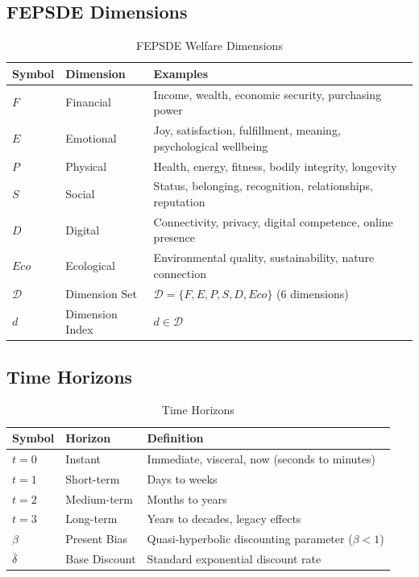 \subsection{FEPSDE Dimensions}

\begin{longtable}{@{}lp{3cm}p{8cm}@{}}
\caption{FEPSDE Welfare Dimensions} \\
\toprule
\textbf{Symbol} & \textbf{Dimension} & \textbf{Examples} \\
\midrule
\endfirsthead
\midrule
\endhead
\bottomrule
\endlastfoot

$F$ & Financial & Income, wealth, economic security, purchasing power \\
$E$ & Emotional & Joy, satisfaction, fulfillment, meaning, psychological wellbeing \\
$P$ & Physical & Health, energy, fitness, bodily integrity, longevity \\
$S$ & Social & Status, belonging, recognition, relationships, reputation \\
$D$ & Digital & Connectivity, privacy, digital competence, online presence \\
$Eco$ & Ecological & Environmental quality, sustainability, nature connection \\
\addlinespace
$\mathcal{D}$ & Dimension Set & $\mathcal{D} = \{F, E, P, S, D, Eco\}$ (6 dimensions) \\
$d$ & Dimension Index & $d \in \mathcal{D}$ \\

\end{longtable}

\subsection{Time Horizons}

\begin{longtable}{@{}lp{3cm}p{8cm}@{}}
\caption{Time Horizons} \\
\toprule
\textbf{Symbol} & \textbf{Horizon} & \textbf{Definition} \\
\midrule
\endfirsthead
\midrule
\endhead
\bottomrule
\endlastfoot

$t = 0$ & Instant & Immediate, visceral, now (seconds to minutes) \\
$t = 1$ & Short-term & Days to weeks \\
$t = 2$ & Medium-term & Months to years \\
$t = 3$ & Long-term & Years to decades, legacy effects \\
\addlinespace
$\beta$ & Present Bias & Quasi-hyperbolic discounting parameter ($\beta < 1$) \\
$\bar{\delta}$ & Base Discount & Standard exponential discount rate \\

\end{longtable}

